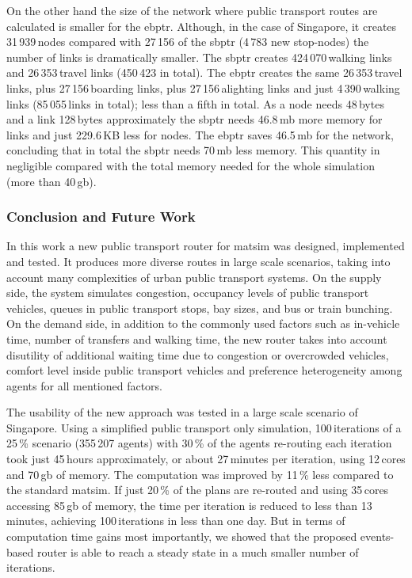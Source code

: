 On the other hand the size of the network where public transport routes are calculated is smaller for the \gls{ebptr}. Although, in the case of Singapore, it creates 31\,939\,nodes compared with 27\,156 of the \gls{sbptr} (4\,783 new stop-nodes) the number of links is dramatically smaller. The \gls{sbptr} creates 424\,070\,walking links and 26\,353\,travel links (450\,423 in total). The \gls{ebptr} creates the same 26\,353\,travel links, plus 27\,156\,boarding links, plus 27\,156\,alighting links and just 4\,390\,walking links (85\,055\,links in total); less than a fifth in total. As a node needs 48\,bytes and a link 128\,bytes approximately the \gls{sbptr} needs 46.8\,\gls{mb} more memory for links and just 229.6\,KB less for nodes. The \gls{ebptr} saves 46.5\,\gls{mb} for the network, concluding that in total the \gls{sbptr} needs 70\,\gls{mb} less memory. This quantity in negligible compared with the total memory needed for the whole simulation (more than 40\,\gls{gb}).

\subsubsection{Conclusion and Future Work} 
\label{sec:ConclusionsAndOutlook}
In this work a new public transport router for \gls{matsim} was designed, implemented and tested. It produces more diverse routes in large scale scenarios, taking into account many complexities of urban public transport systems. On the supply side, the system simulates congestion, occupancy levels of public transport vehicles, queues in public transport stops, bay sizes, and bus or train bunching. On the demand side, in addition to the commonly used factors such as in-vehicle time, number of transfers and walking time, the new router takes into account disutility of additional waiting time due to congestion or overcrowded vehicles, comfort level inside public transport vehicles and preference heterogeneity among agents for all mentioned factors.

The usability of the new approach was tested in a large scale scenario of Singapore. Using a simplified public transport only simulation, 100\,iterations of a 25\,\% scenario (355\,207 agents) with 30\,\% of the agents re-routing each iteration took just 45\,hours approximately, or about 27\,minutes per iteration, using 12\,cores and 70\,\gls{gb} of memory. The computation was improved by 11\,\% less compared to the standard \gls{matsim}. If just 20\,\% of the plans are re-routed and using 35\,cores accessing 85\,\gls{gb} of memory, the time per iteration is reduced to less than 13\,minutes, achieving 100\,iterations in less than one day. But in terms of computation time gains most importantly, we showed that the proposed events-based router is able to reach a steady state in a much smaller number of iterations.

